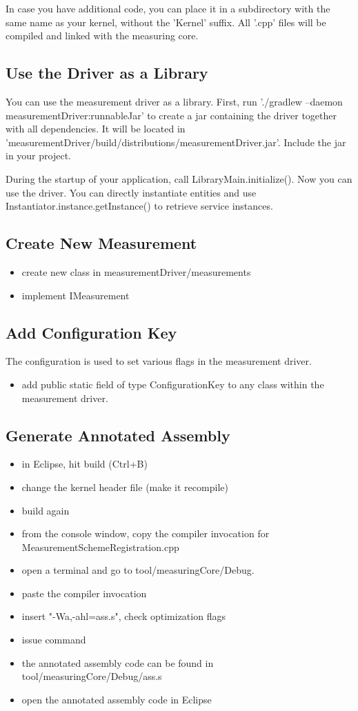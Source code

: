 \documentclass[a4paper,12pt]{article}
\newcommand{\method}[1]{\textsf{#1}}
\begin{document}
In case you have additional code, you can place it in a subdirectory with the
same name as your kernel, without the 'Kernel' suffix. All '.cpp' files will be
compiled and linked with the measuring core.

\subsection{Use the Driver as a Library}
You can use the measurement driver as a library. First, run './gradlew
--daemon measurementDriver:runnableJar' to create a jar containing the driver
together with all dependencies. It will be located in
'measurementDriver/build/distributions/measurementDriver.jar'. Include the jar
in your project.

During the startup of your application, call LibraryMain.initialize(). Now you
can use the driver. You can directly instantiate entities and use
\method{Instantiator.instance.getInstance()} to retrieve service instances.

\subsection{Create New Measurement}
\begin{itemize}
\item create new class in measurementDriver/measurements
\item implement IMeasurement
\end{itemize}

\subsection{Add Configuration Key}
The configuration is used to set various flags in the measurement driver.
\begin{itemize}
\item add public static field of type ConfigurationKey to any class within the
measurement driver.
\end{itemize}

\subsection{Generate Annotated Assembly}
\begin{itemize}
\item in Eclipse, hit build (Ctrl+B)
\item change the kernel header file (make it recompile)
\item build again
\item from the console window, copy the compiler invocation for
MeasurementSchemeRegistration.cpp
\item open a terminal and go to tool/measuringCore/Debug.
\item paste the compiler invocation
\item insert "-Wa,-ahl=ass.s", check optimization flags
\item issue command
\item the annotated assembly code can be found in tool/measuringCore/Debug/ass.s
\item open the annotated assembly code in Eclipse
\end{itemize}
\end{document}

